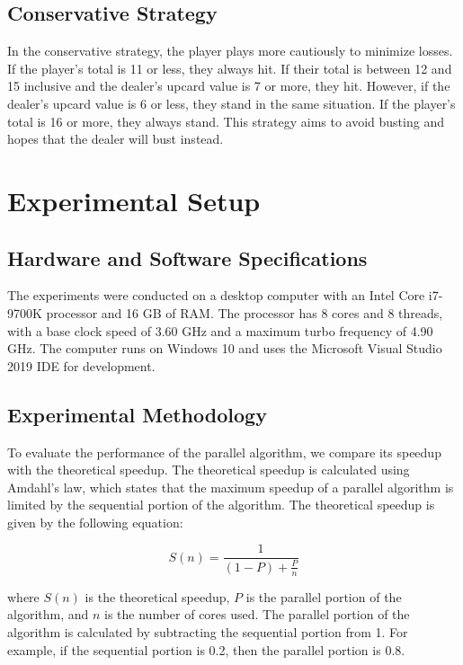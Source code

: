 \documentclass[twocolumn]{report}
\begin{document}
\subsection{Conservative Strategy}
In the conservative strategy, the player plays more cautiously to minimize losses. If the player's total is 11 or less, they always hit. If their total is between 12 and 15 inclusive and the dealer's upcard value is 7 or more, they hit. However, if the dealer's upcard value is 6 or less, they stand in the same situation. If the player's total is 16 or more, they always stand. This strategy aims to avoid busting and hopes that the dealer will bust instead.



\section{Experimental Setup}

\subsection{Hardware and Software Specifications}
The experiments were conducted on a desktop computer with an Intel Core i7-9700K processor and 16 GB of RAM. The processor has 8 cores and 8 threads, with a base clock speed of 3.60 GHz and a maximum turbo frequency of 4.90 GHz. The computer runs on Windows 10 and uses the Microsoft Visual Studio 2019 IDE for development.

\subsection{Experimental Methodology}
To evaluate the performance of the parallel algorithm, we compare its speedup with the theoretical speedup. The theoretical speedup is calculated using Amdahl's law, which states that the maximum speedup of a parallel algorithm is limited by the sequential portion of the algorithm. The theoretical speedup is given by the following equation:

\begin{equation}
    S(n) = \frac{1}{(1-P) + \frac{P}{n}}
\end{equation}

where $S(n)$ is the theoretical speedup, $P$ is the parallel portion of the algorithm, and $n$ is the number of cores used. The parallel portion of the algorithm is calculated by subtracting the sequential portion from 1. For example, if the sequential portion is 0.2, then the parallel portion is 0.8.
\end{document}
